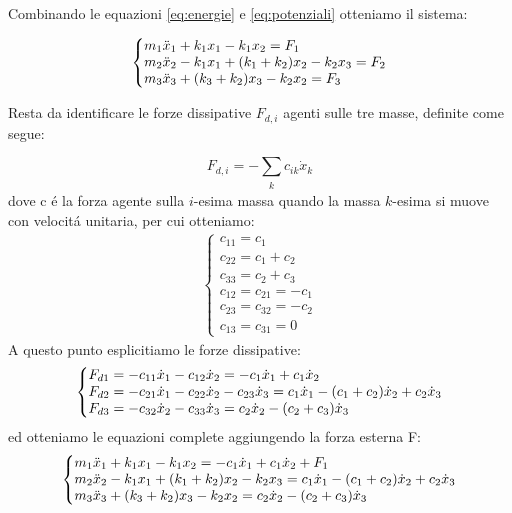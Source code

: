 \documentclass[12pt,a4paper]{article}
\makeatletter
\newenvironment{sistema}%
  {\left\lbrace\begin{array}{@{}l@{}}}%
  {\end{array}\right.}
\makeatother
\begin{document}
 		Combinando le equazioni \ref{eq:energie} e \ref{eq:potenziali} otteniamo il sistema:
		
		\begin{gather}
 		\begin{sistema}
 			m_1 \ddot{x}_1 + k_1x_1 - k_1 x_2 = F_1
 			\\
 			m_2 \ddot{x}_2 - k_1 x_1 + (k_1 +k_2 )x_2 - k_2 x_3  = F_2
 			\\
 			m_3 \ddot{x}_3 + (k_3+k_2) x_3 -k_2 x_2= F_3
 			\label{eq:sistema-1}
 		\end{sistema}
		\end{gather}
 		
		Resta da identificare le forze dissipative $F_{ d,i}$ agenti sulle tre masse, definite come segue:
 		
		\begin{equation}
 			F_{ d,i} = - \sum_{\substack{k}} c_{ik} \dot{x}_k
 		\end{equation}
 		dove c \'e la forza agente sulla $i$-esima massa quando la massa $k$-esima si muove con velocit\'a unitaria, per cui otteniamo:
		\begin{gather}
 		\begin{cases}
		c_{11} = c_{1}
		\\
		c_{22} = c_{1} + c_{2}
		\\
		c_{33} = c_{2} + c_{3}
		\\
		c_{12} = c_{21} = - c_{1}
		\\
		c_{23} = c_{32} = - c_{2}
		\\
		c_{13} = c_{31} = 0
		\end{cases}
		\end{gather}
		A questo punto esplicitiamo le forze dissipative:
		\begin{gather}
		\begin {sistema}
		F_{d1} = - c_{11}\dot x_1 - c_{12}\dot x_2 = -c_1 \dot x_1 + c_1 \dot x_2
		\\
		F_{d2} = - c_{21}\dot x_1 - c_{22}\dot x_2 - c_{23}\dot x_3 = c_1  \dot x_1  - (c_1 + c_2) \dot x_2 + c_2\dot x_3
		\\
		F_{d3} = - c_{32}\dot x_2 - c_{33}\dot x_3 = c_2 \dot x_2 - (c_2 + c_3) \dot x_3		
		\end{sistema}
		\end{gather}
 		ed otteniamo le equazioni complete aggiungendo la forza esterna F:
		\begin{gather}
		\begin {sistema}
		m_1 \ddot{x}_1 + k_1x_1 - k_1 x_2  =  -c_1 \dot x_1 + c_1 \dot x_2 +F_1
		\\
		m_2 \ddot{x}_2 - k_1 x_1 + (k_1 +k_2 )x_2 - k_2 x_3 = c_1  \dot x_1  - (c_1 + c_2) \dot x_2 + c_2\dot x_3
		\\
		m_3 \ddot{x}_3 + (k_3 +k_2 )x_3 -k_2 x_2= c_2 \dot x_2 - (c_2 + c_3) \dot x_3
		\end{sistema}
				\label{eq:completa}
		\end{gather}
		
\end{document}
